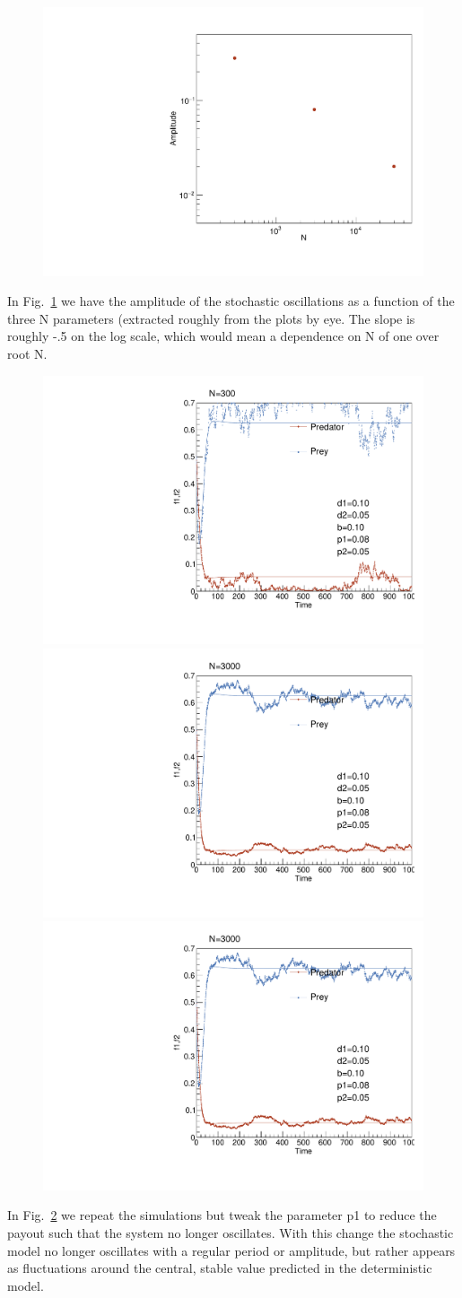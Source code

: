 \documentclass{article}
\begin{document}
\begin{figure}[H]
    \centering
    \includegraphics[width=.6\textwidth]{amplitude.pdf} 
    \caption{}
    \label{fig:fig3b}
\end{figure}

In Fig.~\ref{fig:fig3b} we have the amplitude of the stochastic oscillations as a function of the three N parameters (extracted roughly from the plots by eye. The slope is roughly -.5 on the log scale, which would mean a dependence on N of one over root N.

\begin{figure}[H]
    \centering
    \includegraphics[width=.32\textwidth]{stochIBM_NTot300_p10p08_20171201.pdf} 
    \includegraphics[width=.32\textwidth]{stochIBM_NTot3000_p10p08_20171201.pdf}  
    \includegraphics[width=.32\textwidth]{stochIBM_NTot3000_p10p08_20171201.pdf} 
    \caption{}
    \label{fig:fig4}
\end{figure}

In Fig.~\ref{fig:fig4} we repeat the simulations but tweak the parameter p1 to reduce the payout such that the system no longer oscillates. With this change the stochastic model no longer oscillates with a regular period or amplitude, but rather appears as fluctuations around the central, stable value predicted in the deterministic model.
\end{document}
